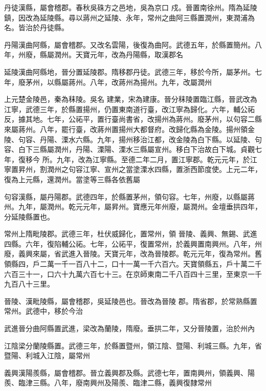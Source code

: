 \begin{pinyinscope}
 丹徒漢縣，屬會稽郡。春秋吳硃方之邑地，吳為京口
 戍。晉置南徐州。隋為延陵鎮，因改為延陵縣。尋以蔣州之延陵、永年，常州之曲阿三縣置潤州，東潤浦為名。皆治於丹徒縣。



 丹陽漢曲阿縣，屬會稽郡。又改名雲陽，後復為曲阿。武德五年，於縣置簡州。八年，州廢，縣屬潤州。天寶元年，改為丹陽縣，取漢郡名



 延陵漢曲阿縣地，晉分置延陵郡。隋移郡丹徒。武德三年，移於今所，屬茅州。七年，廢茅州，以縣屬蔣州。八年，改蔣州為揚州。九年，改屬潤州



 上元楚金陵邑，秦為秣陵。吳名
 建業，宋為建康。晉分秣陵置臨江縣，晉武改為江寧，武德三年，於縣置揚州，仍置東南道行臺，改江寧為歸化。六年，輔公祏反，據其地。七年，公祏平，置行臺尚書省，改揚州為蔣州。廢茅州，以句容二縣來屬蔣州。八年，罷行臺，改蔣州置揚州大都督府。改歸化縣為金陵。揚州領金陵、句容、丹陽、溧水六縣。九年，揚州移治江都，改金陵為白下縣。以延陵、句容、白下三縣屬潤州，丹陽、溧陽、溧水三縣屬宣州。移白下治故白下城。貞觀七年，復移今
 所。九年，改為江寧縣。至德二年二月，置江寧郡。乾元元年，於江寧置昇州，割潤州之句容江寧、宣州之當塗溧水四縣，置浙西節度使。上元二年，復為上元縣，還潤州。當塗等三縣各依舊屬



 句容漢縣，屬丹陽郡。武德四年，於縣置茅州，領句容。七年，州廢，以縣屬蔣州。九年，屬潤州。乾元元年，屬昇州。寶應元年州廢，屬潤州。金壇垂拱四年，分延陵縣置也。



 常州上隋毗陵郡。武德三年，杜伏威歸化，置常州，領
 晉陵、義興、無錫、武進四縣。六年，復陷輔公祏。七年，公祏平，復置常州，於義興置南興州。八年，州廢，義興來屬，省武進入晉陵。天寶元年，改為晉陵郡。乾元元年，復為常州。舊領縣四，戶二萬一千一百八十二，口十一萬一千六百六。天寶領縣五，戶十萬二千六百三十一，口六十九萬六百七十三。在京師東南二千八百四十三里，至東京一千九百八十三里。



 晉陵、漢毗陵縣，屬會稽郡，吳延陵邑也。晉改為晉陵
 郡。隋省郡，於常熟縣置常州。武德中，移於今治



 武進晉分曲阿縣置武進，梁改為蘭陵，隋廢。垂拱二年，又分晉陵置，治於州內



 江陰梁分蘭陵縣置。武德三年，於縣置暨州，領江陰、暨陽、利城三縣。九年，省暨陽、利城入江陰，屬常州



 義興漢陽羨縣，屬會稽郡。晉立義興郡及縣。武德七年，置南興州，領義興、陽羨、臨津三縣。八年，廢南興州及陽羨、臨津二縣，義興復隸常州




\end{pinyinscope}
